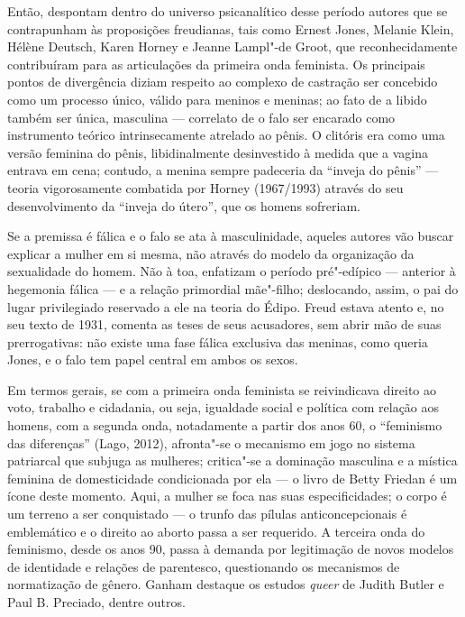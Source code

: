 Então, despontam dentro do universo psicanalítico desse período autores
que se contrapunham às proposições freudianas, tais como Ernest Jones,
Melanie Klein, Hélène Deutsch, Karen Horney e Jeanne Lampl"-de Groot, que
reconhecidamente contribuíram para as articulações da primeira onda
feminista. Os principais pontos de divergência diziam respeito ao
complexo de castração ser concebido como um processo único, válido para
meninos e meninas; ao fato de a libido também ser única, masculina ---
correlato de o falo ser encarado como instrumento teórico
intrinsecamente atrelado ao pênis. O clitóris era como uma versão
feminina do pênis, libidinalmente desinvestido à medida que a vagina
entrava em cena; contudo, a menina sempre padeceria da ``inveja do
pênis'' --- teoria vigorosamente combatida por Horney (1967/1993)
através do seu desenvolvimento da ``inveja do útero'', que os homens
sofreriam.

Se a premissa é fálica e o falo se ata à masculinidade, aqueles autores
vão buscar explicar a mulher em si mesma, não através do modelo da
organização da sexualidade do homem. Não à toa, enfatizam o período
pré"-edípico --- anterior à hegemonia fálica --- e a relação primordial
mãe"-filho; deslocando, assim, o pai do lugar privilegiado reservado a
ele na teoria do Édipo. Freud estava atento e, no seu texto de 1931,
comenta as teses de seus acusadores, sem abrir mão de suas
prerrogativas: não existe uma fase fálica exclusiva das meninas, como
queria Jones, e o falo tem papel central em ambos os sexos.

Em termos gerais, se com a primeira onda feminista se reivindicava
direito ao voto, trabalho e cidadania, ou seja, igualdade social e
política com relação aos homens, com a segunda onda, notadamente a
partir dos anos 60, o ``feminismo das diferenças'' (Lago, 2012),
afronta"-se o mecanismo em jogo no sistema patriarcal que subjuga as
mulheres; critica"-se a dominação masculina e a mística feminina de
domesticidade condicionada por ela --- o livro de Betty Friedan é um
ícone deste momento. Aqui, a mulher se foca nas suas especificidades; o
corpo é um terreno a ser conquistado --- o trunfo das pílulas
anticoncepcionais é emblemático e o direito ao aborto passa a ser
requerido. A terceira onda do feminismo, desde os anos 90, passa à
demanda por legitimação de novos modelos de identidade e relações de
parentesco, questionando os mecanismos de normatização de gênero. Ganham
destaque os estudos \emph{queer} de Judith Butler e Paul B. Preciado,
dentre outros.

